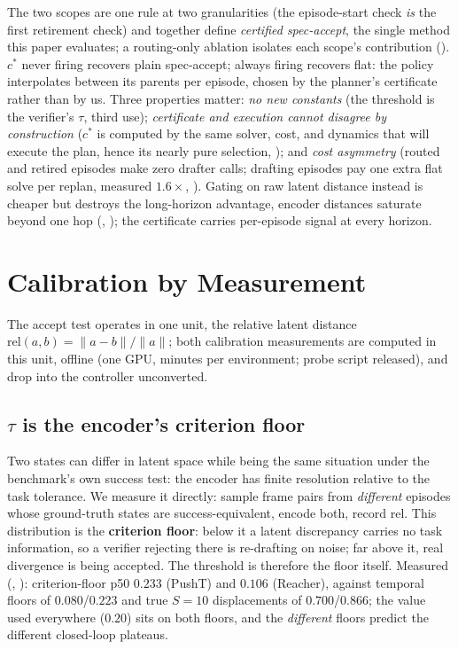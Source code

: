 \documentclass{article}
\begin{document}
The two scopes are one rule at two granularities (the episode-start check
\emph{is} the first retirement check) and together define \emph{certified
spec-accept}, the single method this paper evaluates; a routing-only ablation
isolates each scope's contribution (). $c^{*}$ never firing
recovers plain spec-accept; always firing recovers flat: the policy
interpolates between its parents per episode, chosen by the planner's
certificate rather than by us. Three properties matter: \emph{no new
constants} (the threshold is the verifier's $\tau$, third use);
\emph{certificate and execution cannot disagree by construction} ($c^{*}$ is
computed by the same solver, cost, and dynamics that will execute the plan,
hence its nearly pure selection, ); and \emph{cost
asymmetry} (routed and retired episodes make zero drafter calls; drafting
episodes pay one extra flat solve per replan, measured $1.6\times$,
). Gating on raw latent distance instead is cheaper but
destroys the long-horizon advantage, encoder distances saturate beyond one
hop (, ); the certificate carries
per-episode signal at every horizon.

\section{Calibration by Measurement}
\label{sec:calib}
The accept test operates in one unit, the relative latent distance
$\mathrm{rel}(a,b) = \|a-b\|/\|a\|$; both calibration measurements are computed
in this unit, offline (one GPU, minutes per environment; probe script
released), and drop into the controller unconverted.

\subsection{$\tau$ is the encoder's criterion floor}
\label{sec:calib-tau}
Two states can differ in latent space while being the same situation under the
benchmark's own success test: the encoder has finite resolution relative to
the task tolerance. We measure it directly: sample frame pairs from
\emph{different} episodes whose ground-truth states are success-equivalent,
encode both, record $\mathrm{rel}$. This distribution is the
\textbf{criterion floor}: below it a latent discrepancy carries no task
information, so a verifier rejecting there is re-drafting on noise; far above
it, real divergence is being accepted. The threshold is therefore the floor
itself. Measured (, ): criterion-floor p50
$0.233$ (PushT) and $0.106$ (Reacher), against temporal floors of
$0.080$/$0.223$ and true $S{=}10$ displacements of $0.700$/$0.866$; the value
used everywhere ($0.20$) sits on both floors, and the \emph{different} floors
predict the different closed-loop plateaus.
\end{document}
